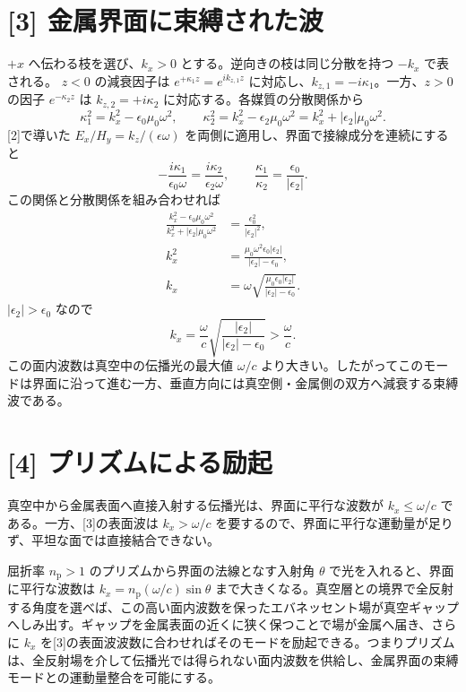 \documentclass[11pt,a4paper]{article}
\begin{document}
\section*{[3] 金属界面に束縛された波}
$+x$ へ伝わる枝を選び、$k_x>0$ とする。逆向きの枝は同じ分散を持つ $-k_x$ で表される。
$z<0$ の減衰因子は $e^{+\kappa_1z}=e^{ik_{z,1}z}$ に対応し、$k_{z,1}=-i\kappa_1$。一方、$z>0$ の因子 $e^{-\kappa_2z}$ は $k_{z,2}=+i\kappa_2$ に対応する。各媒質の分散関係から
\begin{equation}
  \kappa_1^2=k_x^2-\epsilon_0\mu_0\omega^2,\qquad
  \kappa_2^2=k_x^2-\epsilon_2\mu_0\omega^2
  =k_x^2+|\epsilon_2|\mu_0\omega^2.
\end{equation}
[2]で導いた $E_x/H_y=k_z/(\epsilon\omega)$ を両側に適用し、界面で接線成分を連続にすると
\begin{equation}
  -\frac{i\kappa_1}{\epsilon_0\omega}
  =\frac{i\kappa_2}{\epsilon_2\omega},\qquad
  \boxed{\frac{\kappa_1}{\kappa_2}=\frac{\epsilon_0}{|\epsilon_2|}}.
\end{equation}
この関係と分散関係を組み合わせれば
\begin{align}
  \frac{k_x^2-\epsilon_0\mu_0\omega^2}
       {k_x^2+|\epsilon_2|\mu_0\omega^2}
  &=\frac{\epsilon_0^2}{|\epsilon_2|^2},\\
  \boxed{k_x^2} &=\frac{\mu_0\omega^2\epsilon_0|\epsilon_2|}
                        {|\epsilon_2|-\epsilon_0},\\
  \boxed{k_x} &=\omega\sqrt{\frac{\mu_0\epsilon_0|\epsilon_2|}
                                      {|\epsilon_2|-\epsilon_0}}.
\end{align}
$|\epsilon_2|>\epsilon_0$ なので
\begin{equation}
  \boxed{k_x=\frac{\omega}{c}\sqrt{\frac{|\epsilon_2|}{|\epsilon_2|-\epsilon_0}}>
  \frac{\omega}{c}}.
\end{equation}
この面内波数は真空中の伝播光の最大値 $\omega/c$ より大きい。したがってこのモードは界面に沿って進む一方、垂直方向には真空側・金属側の双方へ減衰する束縛波である。

\section*{[4] プリズムによる励起}
真空中から金属表面へ直接入射する伝播光は、界面に平行な波数が $k_x\leq\omega/c$ である。一方、[3]の表面波は $k_x>\omega/c$ を要するので、界面に平行な運動量が足りず、平坦な面では直接結合できない。

屈折率 $n_{\mathrm p}>1$ のプリズムから界面の法線となす入射角 $\theta$ で光を入れると、界面に平行な波数は $k_x=n_{\mathrm p}(\omega/c)\sin\theta$ まで大きくなる。真空層との境界で全反射する角度を選べば、この高い面内波数を保ったエバネッセント場が真空ギャップへしみ出す。ギャップを金属表面の近くに狭く保つことで場が金属へ届き、さらに $k_x$ を[3]の表面波波数に合わせればそのモードを励起できる。つまりプリズムは、全反射場を介して伝播光では得られない面内波数を供給し、金属界面の束縛モードとの運動量整合を可能にする。
\end{document}
